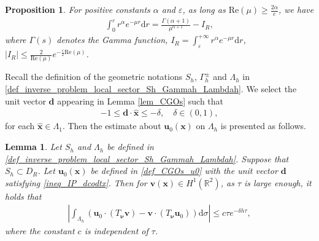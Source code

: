\documentclass[11pt,reqno,oneside]{amsart}
\newtheorem{lemma}{Lemma}[section]
\newtheorem{proposition}{Proposition}[section]
\theoremstyle{definition}
\theoremstyle{remark}
\numberwithin{equation}{section}
\numberwithin{equation}{section}
\theoremstyle{remark}
\begin{document}
\begin{proposition} \label{prop_inverse_problem_integral_re}
	For positive constants $ \alpha $ and $ \varepsilon $, as long as $ \mathrm{Re}  \left(\mu\right) \geqslant \frac{2\alpha}{e} $, we have
	\begin{align*} 
		\int_{0}^{\varepsilon} r^\alpha e^{- \mu r} \mathrm{d}r = \frac{\Gamma \left( \alpha + 1 \right)}{\mu^{\alpha + 1}} - I_R,
	\end{align*}
	where $ \Gamma \left(s\right)$ denotes the Gamma function, $ I_R = \int_{\varepsilon}^{+\infty} r^\alpha e^{-\mu r} \mathrm{d}r $, $ \left| I_R \right| \leqslant \frac{2}{\mathrm{Re}\left(\mu\right)} e^{ - \frac{\varepsilon}{2} \mathrm{Re} \left(\mu\right)} $. 
\end{proposition}

Recall the definition of the geometric notations $ S_h $, $ \Gamma^{\pm}_h $ and $ \Lambda_h $ in \eqref{def_inverse_problem_local_sector_Sh_Gammah_Lambdah}. We select the unit vector $ \mathbf{d} $ appearing in Lemma \ref{lem_CGOs} such that 
\begin{align} \label{ineq_IP_dcodtx}
	-1 \leqslant \mathbf{d} \cdot \hat{\mathbf{x}} \leqslant - \delta ,\quad \delta \in \left(0,1\right),
\end{align}
for each $ \hat{\mathbf{x}} \in \Lambda_1 $. Then the estimate about $ \mathbf{u}_0\left(\mathbf{x}\right) $ on $ \Lambda_h $ is presented as follows.

\begin{lemma} \label{lem_IP_est_int_Lamdah_u0Tv-vTu0} 
	Let $ S_h $ and $ \Lambda_h $ be defined in \eqref{def_inverse_problem_local_sector_Sh_Gammah_Lambdah}. Suppose that $ S_h\subset D_R $. Let $ \mathbf{u}_0\left(\mathbf{x}\right) $ be defined in \eqref{def_CGOs_u0} with the unit vector $ \mathbf{d} $ satisfying \eqref{ineq_IP_dcodtx}. Then for $ \mathbf{v}\left(\mathbf{x}\right) \in H^1\left(\mathbb{R}^2\right) $, as $ \tau $ is large enough, it holds that
	\begin{align} \label{est_IP_int_Lamdah_u0Tv-vTu0} 
		\left| \int_{\Lambda_h} \left(\mathbf{u}_0 \cdot \left( T_{\bm{\nu}} \mathbf{v} \right) - \mathbf{v} \cdot \left(T_{\bm{\nu}} \mathbf{u}_0\right)\right) \mathrm{d}\sigma \right| \leqslant c\tau e^{- \delta h \tau},
	\end{align}  
	where the constant $ c $ is independent of $ \tau $.
\end{lemma}
\end{document}
